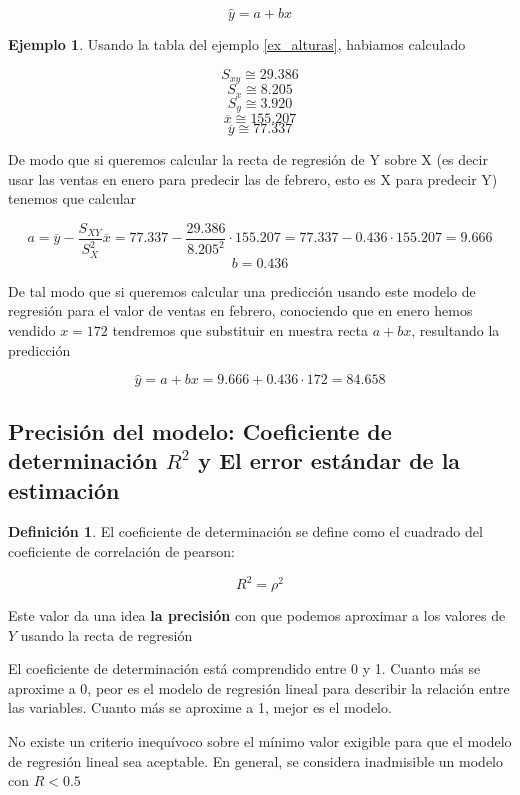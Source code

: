 \documentclass[]{book}
\theoremstyle{plain}
\theoremstyle{definition}
\newtheorem{definition}[theorem]{Definición}
\newtheorem{example}[theorem]{Ejemplo}
\begin{document}
\[\hat y = a + b x\]

\begin{example}
  Usando la tabla del ejemplo  \ref{ex_alturas}, habiamos
calculado

\[S_{xy} \cong 29.386\] \[S_x \cong 8.205\] \[S_y \cong 3.920\]
\[\overline x \cong155.207\] \[\overline y \cong77.337 \]

De modo que si queremos calcular la recta de regresión de Y sobre X (es
decir usar las ventas en enero para predecir las de febrero, esto es X
para predecir Y) tenemos que calcular

\[a = \overline{y} - \frac{S_{XY}}{S^2_X} \overline x = 77.337 - \frac{29.386}{8.205^2}\cdot 155.207 = 77.337 - 0.436 \cdot 155.207 = 9.666\]
\[b = 0.436\]

De tal modo que si queremos calcular una predicción usando este modelo
de regresión para el valor de ventas en febrero, conociendo que en enero
hemos vendido \(x=172\) tendremos que substituir en nuestra recta
\(a + bx\), resultando la predicción

\[\hat y = a+bx = 9.666 + 0.436 \cdot 172 = 84.658\]
\end{example}


\subsection{Precisión del modelo: Coeficiente de determinación \(R^2\) y El error estándar de la
estimación}

\begin{definition}
  El coeficiente de determinación se define como el cuadrado del
coeficiente de correlación de pearson:

\[R^2 = \rho ^2\]

Este valor da una idea \textbf{la precisión} con que podemos aproximar a
los valores de \(Y\) usando la recta de regresión

El coeficiente de determinación está comprendido entre 0 y 1. Cuanto más
se aproxime a 0, peor es el modelo de regresión lineal para describir la
relación entre las variables. Cuanto más se aproxime a 1, mejor es el
modelo.

No existe un criterio inequívoco sobre el mínimo valor exigible para que
el modelo de regresión lineal sea aceptable. En general, se considera
inadmisible un modelo con \(R<0.5\)
\end{definition}
\end{document}
